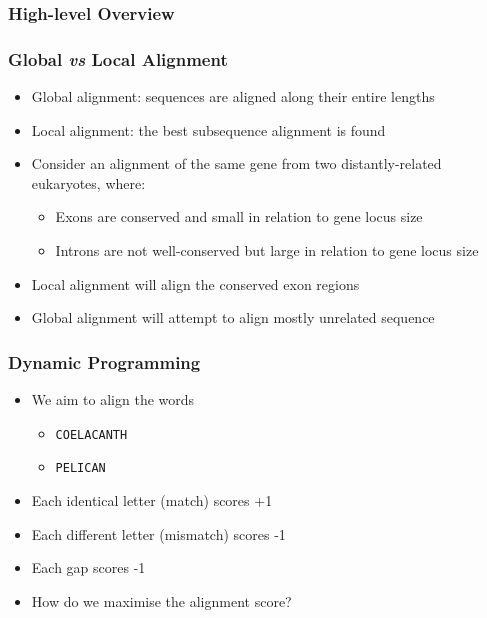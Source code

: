 \documentclass[table]{beamer}
\begin{document}
    \begin{frame}
      \frametitle{High-level Overview}
    \end{frame}

    \begin{frame}
     \frametitle{Global \textit{vs} Local Alignment}
     \begin{itemize}
       \item<1-> Global alignment: sequences are aligned along their entire lengths
       \item<1-> Local alignment: the best subsequence alignment is found
       \item<2-> Consider an alignment of the same gene from two distantly-related eukaryotes, where:
         \begin{itemize}
           \item<2-> Exons are conserved and small in relation to gene locus size
           \item<2-> Introns are not well-conserved but large in relation to gene locus size
         \end{itemize}
       \item<3-> Local alignment will align the conserved exon regions
       \item<3-> Global alignment will attempt to align mostly unrelated sequence
     \end{itemize}
    \end{frame}

    \begin{frame}
     \frametitle{Dynamic Programming}
     \begin{itemize}
       \item<1-> We aim to align the words
       \begin{itemize}
         \item<1-> \texttt{COELACANTH}
         \item<1-> \texttt{PELICAN}
       \end{itemize}
       \item<2-> Each identical letter (match) scores +1
       \item<2-> Each different letter (mismatch) scores -1
       \item<2-> Each gap scores -1
       \item<3-> How do we maximise the alignment score?
     \end{itemize}
    \end{frame}   
   
\end{document}
